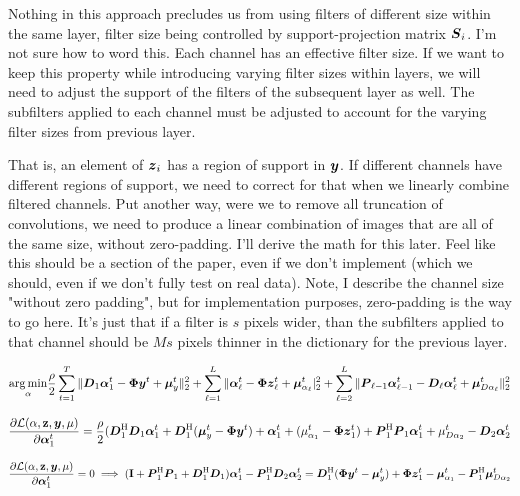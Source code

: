 \documentclass{article}
\begin{document}
Nothing in this approach precludes us from using filters of different size within the same layer, filter size being controlled by support-projection matrix $\boldsymbol{S}_i$.  I'm not sure how to word this. Each channel has an effective filter size. If we want to keep this property while introducing varying filter sizes within layers, we will need to adjust the support of the filters of the subsequent layer as well. The subfilters applied to each channel must be adjusted to account for the varying filter sizes from previous layer.

That is, an element of $\boldsymbol{z}_i$ has a region of support in $\boldsymbol{y}$. If different channels have different regions of support, we need to correct for that when we linearly combine filtered channels.  Put another way, were we to remove all truncation of convolutions, we need to produce a linear combination of images that are all of the same size, without zero-padding.  I'll derive the math for this later. Feel like this should be a section of the paper, even if we don't implement (which we should, even if we don't fully test on real data).  Note, I describe the channel size "without zero padding", but for implementation purposes, zero-padding is the way to go here.  It's just that if a filter is $s$ pixels wider, than the subfilters applied to that channel should be $Ms$ pixels thinner in the dictionary for the previous layer.


\begin{equation}
\underset{\mathbf{\alpha}}{\arg\min} \frac{\rho}{2}\sum_{t = 1}^T \|\boldsymbol{D}_1\boldsymbol{\alpha}_1^t - \boldsymbol{\Phi}\boldsymbol{y}^t + \boldsymbol{\mu}_y^t\|_2^2 + \sum_{\ell = 1}^L \|\boldsymbol{\alpha}_{\ell}^t - \boldsymbol{\Phi}\boldsymbol{z}_{\ell}^t + \boldsymbol{\mu}_{\alpha_{\ell}}^t|_2^2 + \sum_{\ell = 2}^L \| \boldsymbol{P}_{\ell - 1} \boldsymbol{\alpha}_{\ell - 1}^t - \boldsymbol{D}_{\ell}\boldsymbol{\alpha}_{\ell}^t + \boldsymbol{\mu}_{D\alpha_{\ell}}^t\|_2^2
\end{equation}

\begin{equation}
\frac{\partial \mathcal{L}(\mathbf{\alpha},\mathbf{z},\boldsymbol{y},\mathbf{\mu})}{\partial \boldsymbol{\alpha}_1^t} =
\frac{\rho}{2}(\boldsymbol{D}_1^{\mathrm{H}}\boldsymbol{D}_1\boldsymbol{\alpha}_1^t
+ \boldsymbol{D}_1^{\mathrm{H}}(\boldsymbol{\mu}_y^t - \boldsymbol{\Phi}\boldsymbol{y}^t) 
+ \boldsymbol{\alpha}_1^t 
+ (\mu_{\alpha_1}^t - \boldsymbol{\Phi} \boldsymbol{z}_1^t) 
+ \boldsymbol{P}_{1}^{\mathrm{H}}\boldsymbol{P}_1\boldsymbol{\alpha}_1^t 
+ \mu_{D\alpha_2}^t 
- \boldsymbol{D}_2\boldsymbol{\alpha}_2^t
\end{equation}

\begin{equation}
\frac{\partial \mathcal{L}(\mathbf{\alpha},\mathbf{z},\boldsymbol{y},\mathbf{\mu})}{\partial \boldsymbol{\alpha}_1^t} = 0 \implies ({\bf I} + \boldsymbol{P}_1^{\mathrm{H}}\boldsymbol{P}_1 + \boldsymbol{D}_1^{\mathrm{H}}\boldsymbol{D}_1)\boldsymbol{\alpha}_1^t - \boldsymbol{P}_1^{\mathrm{H}}\boldsymbol{D}_2\boldsymbol{\alpha}_2^t = \boldsymbol{D}_1^{\mathrm{H}}(\boldsymbol{\Phi}\boldsymbol{y}^t - \boldsymbol{\mu}_y^t) + \boldsymbol{\Phi}\boldsymbol{z}_1^t - \boldsymbol{\mu}_{\alpha_1}^t - \boldsymbol{P}_1^{\mathrm{H}}\boldsymbol{\mu}_{D\alpha_2}^t
\end{equation}
\end{document}
